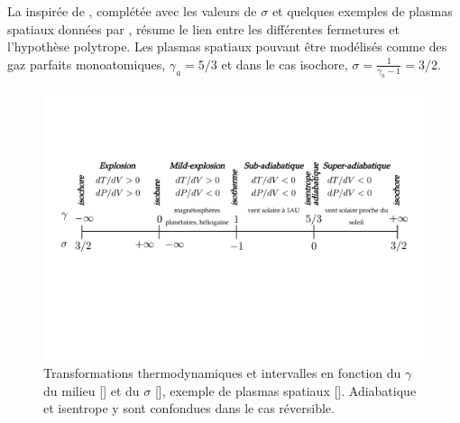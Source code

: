 La  inspirée de \cite{livadiotis_non-equilibrium_2012}, complétée avec les valeurs de $\sigma$ et quelques exemples de plasmas spatiaux données par \cite{livadiotis_long-term_2018}, résume le lien entre les différentes fermetures et l'hypothèse polytrope. Les plasmas spatiaux pouvant être modélisés comme des gaz parfaits monoatomiques, $\gamma_a = 5/3$ et dans le cas isochore, $\sigma = \frac{1}{\gamma_a-1}=3/2$.
\begin{figure}[!ht]
 \centering
\includegraphics[width=0.9\linewidth,trim=1cm 8cm 1cm 5.5cm, clip=true]{./Mainmatter/Part_1/images/schema_thermo.pdf}
\caption{Transformations thermodynamiques et intervalles en fonction du $\gamma$ du milieu [\cite{livadiotis_non-equilibrium_2012}] et du $\sigma$ [\cite{borel_thermodynamique_2005}], exemple de plasmas spatiaux [\cite{livadiotis_long-term_2018}]. Adiabatique et isentrope y sont confondues dans le cas réversible.}
\label{fig:schema_thermo}
\end{figure}

